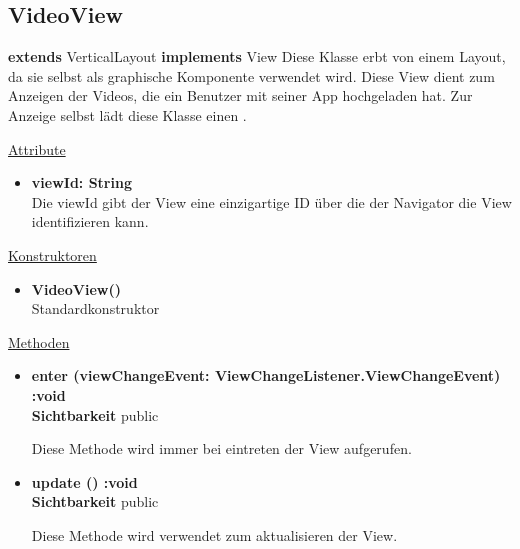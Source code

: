 \newpage
\subsection{VideoView}\label{VideoView}
\textbf{extends}  VerticalLayout \newline
\textbf{implements} View \newline
Diese Klasse erbt von einem Layout, da sie selbst als graphische Komponente verwendet wird. Diese View dient zum Anzeigen der Videos, die ein Benutzer mit seiner App hochgeladen hat. Zur Anzeige selbst lädt diese Klasse einen .
\newline

\underline{Attribute}
\begin{itemize}
\itemsep0pt
\item \textbf{viewId: String} \hfill\\ 
Die viewId gibt der View eine einzigartige ID über die der Navigator die View identifizieren kann.

\end{itemize}

\underline{Konstruktoren}
\begin{itemize}
\itemsep0pt
\item \textbf{VideoView()} \hfill\\
Standardkonstruktor
\end{itemize}

\underline{Methoden}
\begin{itemize}
\itemsep0pt
\item \textbf{enter (viewChangeEvent: ViewChangeListener.ViewChangeEvent) :void}\hfill\\
\textbf{Sichtbarkeit} public

Diese Methode wird immer bei eintreten der View aufgerufen.

\item \textbf{update () :void}\hfill\\
\textbf{Sichtbarkeit} public

Diese Methode wird verwendet zum aktualisieren der View.

\end{itemize}
